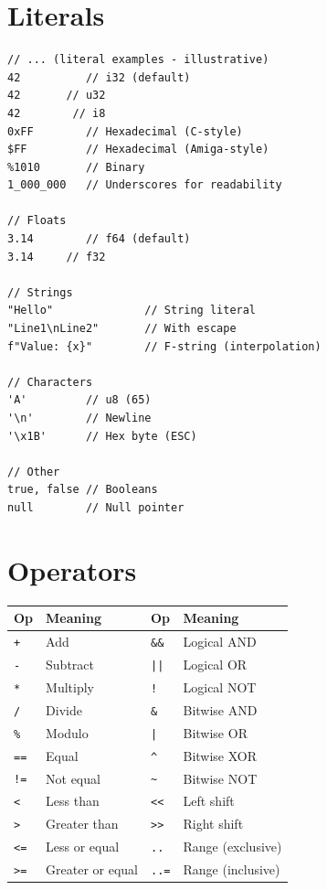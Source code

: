 \section{Literals}

\begin{lstlisting}
// ... (literal examples - illustrative)
42          // i32 (default)
42       // u32
42        // i8
0xFF        // Hexadecimal (C-style)
$FF         // Hexadecimal (Amiga-style)
%1010       // Binary
1_000_000   // Underscores for readability

// Floats
3.14        // f64 (default)
3.14     // f32

// Strings
"Hello"              // String literal
"Line1\nLine2"       // With escape
f"Value: {x}"        // F-string (interpolation)

// Characters
'A'         // u8 (65)
'\n'        // Newline
'\x1B'      // Hex byte (ESC)

// Other
true, false // Booleans
null        // Null pointer
\end{lstlisting}

\section{Operators}

\begin{center}
\begin{tabular}{ll|ll}
\textbf{Op} & \textbf{Meaning} & \textbf{Op} & \textbf{Meaning} \\
\hline
\texttt{+} & Add & \texttt{\&\&} & Logical AND \\
\texttt{-} & Subtract & \texttt{||} & Logical OR \\
\texttt{*} & Multiply & \texttt{!} & Logical NOT \\
\texttt{/} & Divide & \texttt{\&} & Bitwise AND \\
\texttt{\%} & Modulo & \texttt{|} & Bitwise OR \\
\texttt{==} & Equal & \texttt{\^{}} & Bitwise XOR \\
\texttt{!=} & Not equal & \texttt{\~{}} & Bitwise NOT \\
\texttt{<} & Less than & \texttt{<<} & Left shift \\
\texttt{>} & Greater than & \texttt{>>} & Right shift \\
\texttt{<=} & Less or equal & \texttt{..} & Range (exclusive) \\
\texttt{>=} & Greater or equal & \texttt{..=} & Range (inclusive) \\
\end{tabular}
\end{center}

